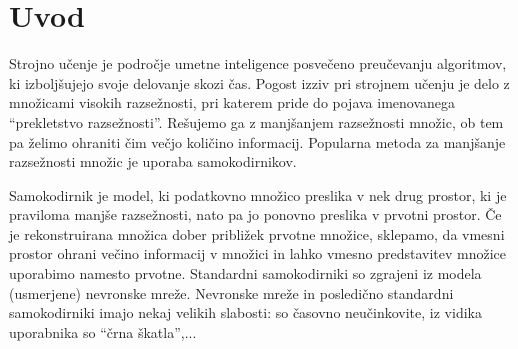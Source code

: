 \documentclass[12pt,a4paper,twoside]{article}
\theoremstyle{definition} %
\theoremstyle{plain} %
\numberwithin{equation}{section}  %
\begin{document}


\section{Uvod}



Strojno učenje je področje umetne inteligence posvečeno preučevanju algoritmov, ki izboljšujejo svoje delovanje skozi čas.
Pogost izziv pri strojnem učenju je delo z množicami visokih razsežnosti, pri katerem pride do pojava imenovanega ``prekletstvo razsežnosti''.
Rešujemo ga z manjšanjem razsežnosti množic, ob tem pa želimo ohraniti čim večjo količino informacij.
Popularna metoda za manjšanje razsežnosti množic je uporaba samokodirnikov.

Samokodirnik je model, ki podatkovno množico preslika v nek drug prostor, ki je praviloma manjše razsežnosti, nato pa jo ponovno preslika v prvotni prostor. %
Če je rekonstruirana množica dober približek prvotne množice, sklepamo, da vmesni prostor ohrani večino informacij v množici in lahko vmesno predstavitev množice uporabimo namesto prvotne. %
Standardni samokodirniki so zgrajeni iz modela (usmerjene) nevronske mreže.
Nevronske mreže in posledično standardni samokodirniki imajo nekaj velikih slabosti: so časovno neučinkovite, iz vidika uporabnika so ``črna škatla'',...
\end{document}
